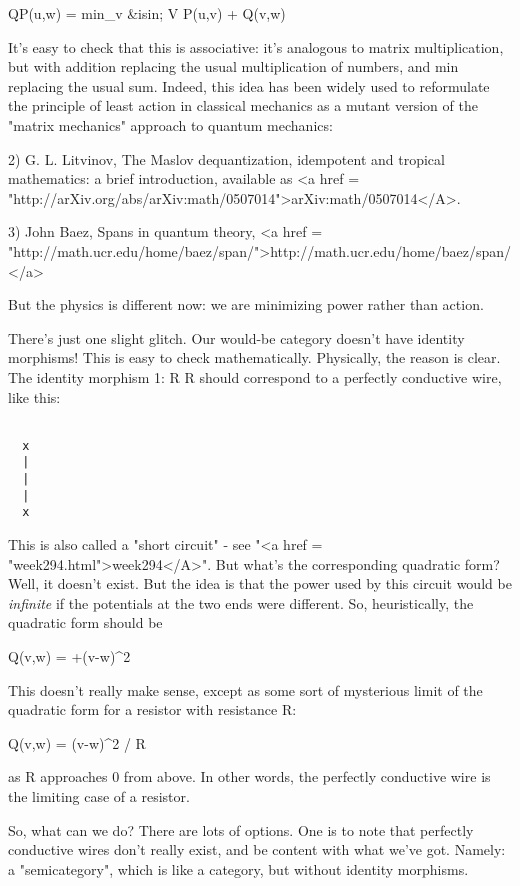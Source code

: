 QP(u,w) = min_{v &isin; V} P(u,v) + Q(v,w)

It's easy to check that this is associative: it's analogous to matrix
multiplication, but with addition replacing the usual multiplication
of numbers, and min replacing the usual sum.  Indeed, this idea has
been widely used to reformulate the principle of least action in
classical mechanics as a mutant version of the "matrix mechanics"
approach to quantum mechanics:

2) G. L. Litvinov, The Maslov dequantization, idempotent and tropical
mathematics: a brief introduction, available as <a href = "http://arXiv.org/abs/arXiv:math/0507014">arXiv:math/0507014</A>.

3) John Baez, Spans in quantum theory, <a href = "http://math.ucr.edu/home/baez/span/">http://math.ucr.edu/home/baez/span/</a>

But the physics is different now: we are minimizing power rather than
action.

There's just one slight glitch.  Our would-be category doesn't have
identity morphisms!  This is easy to check mathematically.  Physically, 
the reason is clear.  The identity morphism 1: R \to  R should correspond
to a perfectly conductive wire, like this:


\begin{verbatim}

  x  
  |  
  |  
  |  
  x  
\end{verbatim}
    

This is also called a "short circuit" - see "<a href =
"week294.html">week294</A>".  But what's the corresponding
quadratic form?  Well, it doesn't exist.  But the idea is that the
power used by this circuit would be \emph{infinite} if the potentials at
the two ends were different.  So, heuristically, the quadratic form
should be

Q(v,w) = +\infty (v-w)^{2}

This doesn't really make sense, except as some sort of mysterious 
limit of the quadratic form for a resistor with resistance R:

Q(v,w) = (v-w)^{2} / R

as R approaches 0 from above.  In other words, the perfectly
conductive wire is the limiting case of a resistor.

So, what can we do?  There are lots of options.  One is to note that
perfectly conductive wires don't really exist, and be content with
what we've got.  Namely: a "semicategory", which is like a
category, but without identity morphisms.

